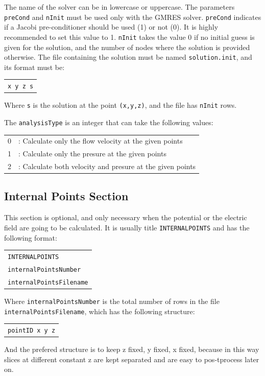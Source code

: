 \documentclass[12pt]{article}
\begin{document}
The name of the solver can be in lowercase or uppercase. The parameters \verb+preCond+ and \verb+nInit+ must be used only with the GMRES solver. \verb+preCond+ indicates if a Jacobi pre-conditioner should be used (1) or not (0). It is highly recommended to set this value to 1. \verb+nInit+ takes the value 0 if no initial guess is given for the solution, and the number of nodes where the solution is provided otherwise. The file containing the solution must be named \verb+solution.init+, and its format must be:

\begin{tabular}{l}
\texttt{x y z s}
\end{tabular}

Where \verb+s+ is the solution at the point \verb+(x,y,z)+, and the file has \verb+nInit+ rows.

The \verb+analysisType+ is an integer that can take the following values:

\begin{tabular}{rl}
0&: Calculate only the flow velocity at the given points\\
1&: Calculate only the presure at the given points\\
2&: Calculate both velocity and presure at the given points
\end{tabular}

\subsection{Internal Points Section}
This section is optional, and only necessary when the potential or the electric field are going to be calculated. It is usually title \verb+INTERNALPOINTS+ and has the following format:

\begin{tabular}{l}
\texttt{INTERNALPOINTS}\\
\texttt{internalPointsNumber}\\
\texttt{internalPointsFilename}
\end{tabular}

Where \verb+internalPointsNumber+ is the total number of rows in the file \verb+internalPointsFilename+, which has the following structure:

\begin{tabular}{l}
\texttt{pointID x y z}
\end{tabular}

And the prefered structure is to keep z fixed, y fixed, x fixed, because in this way slices at different constant z are kept separated and are easy to pos-tprocess later on.
\end{document}
